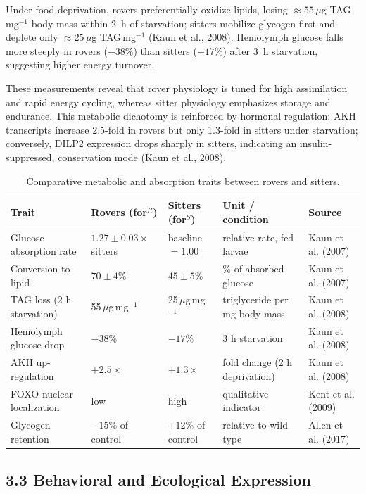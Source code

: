\documentclass[11pt]{article}
\begin{document}
Under food deprivation, rovers preferentially oxidize lipids, losing $\approx 55$\,$\mu$g TAG\,mg$^{-1}$ body mass within 2~h of starvation; sitters mobilize glycogen first and deplete only $\approx 25$\,$\mu$g TAG\,mg$^{-1}$ (Kaun et al., 2008). Hemolymph glucose falls more steeply in rovers ($-38$\%) than sitters ($-17$\%) after 3~h starvation, suggesting higher energy turnover.

These measurements reveal that rover physiology is tuned for high assimilation and rapid energy cycling, whereas sitter physiology emphasizes storage and endurance. This metabolic dichotomy is reinforced by hormonal regulation: AKH transcripts increase 2.5-fold in rovers but only 1.3-fold in sitters under starvation; conversely, DILP2 expression drops sharply in sitters, indicating an insulin-suppressed, conservation mode (Kaun et al., 2008).

\begin{table}[ht]
  \centering
  \begin{tabular}{lllll}
    \toprule
    Trait & Rovers (for$^R$) & Sitters (for$^S$) & Unit / condition & Source \\
    \midrule
    Glucose absorption rate & $1.27 \pm 0.03 \times$ sitters & baseline $= 1.00$ & relative rate, fed larvae & Kaun et al. (2007) \\
    Conversion to lipid & $70 \pm 4$\% & $45 \pm 5$\% & \% of absorbed glucose & Kaun et al. (2007) \\
    TAG loss (2 h starvation) & 55\,$\mu$g\,mg$^{-1}$ & 25\,$\mu$g\,mg$^{-1}$ & triglyceride per mg body mass & Kaun et al. (2008) \\
    Hemolymph glucose drop & $-38$\% & $-17$\% & 3 h starvation & Kaun et al. (2008) \\
    AKH up-regulation & $+2.5 \times$ & $+1.3 \times$ & fold change (2 h deprivation) & Kaun et al. (2008) \\
    FOXO nuclear localization & low & high & qualitative indicator & Kent et al. (2009) \\
    Glycogen retention & $-15$\% of control & $+12$\% of control & relative to wild type & Allen et al. (2017) \\
    \bottomrule
  \end{tabular}
  \caption{Comparative metabolic and absorption traits between rovers and sitters.}
\end{table}

\subsection*{3.3 Behavioral and Ecological Expression}
\end{document}
